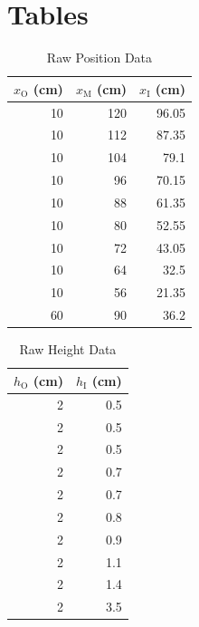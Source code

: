 \section{Tables}
%
\begin{table}[ht]
    \centering
    \begin{tabular}{|r|r|r|}
        \hline
        $x_{\text{O}}$ (cm) & $x_{\text{M}}$ (cm) & $x_{\text{I}}$ (cm) \\
        \hline
        10 & 120 & 96.05 \\
        10 & 112 & 87.35 \\
        10 & 104 & 79.1 \\
        10 & 96 & 70.15 \\
        10 & 88 & 61.35 \\
        10 & 80 & 52.55 \\
        10 & 72 & 43.05 \\
        10 & 64 & 32.5 \\
        10 & 56 & 21.35 \\
        60 & 90 & 36.2 \\
        \hline
    \end{tabular}
    \caption{Raw Position Data}
    \label{table.07.position}
\end{table}
%
\begin{table}[ht]
    \centering
    \begin{tabular}{|r|r|}
        \hline
        $h_{\text{O}}$ (cm) & $h_{\text{I}}$ (cm) \\
        \hline
        2 & 0.5 \\
        2 & 0.5 \\
        2 & 0.5 \\
        2 & 0.7 \\
        2 & 0.7 \\
        2 & 0.8 \\
        2 & 0.9 \\
        2 & 1.1 \\
        2 & 1.4 \\
        2 & 3.5 \\
        \hline
    \end{tabular}
    \caption{Raw Height Data}
    \label{table.07.height}
\end{table}
%
